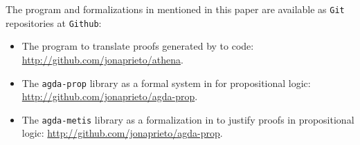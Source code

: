 \documentclass[../main.tex]{subfiles}
\begin{document}

The program and formalizations in \Agda mentioned in this paper are available
as \verb!Git! repositories at \verb!Github!:

\begin{itemize}
  \item The \Athena program to translate proofs generated by \Metis to \Agda code:
  \url{http://github.com/jonaprieto/athena}.
  \item The \verb!agda-prop! library as a formal system in \Agda for propositional logic:
  \url{http://github.com/jonaprieto/agda-prop}.
  \item The \verb!agda-metis! library as a formalization in \Agda to justify \Metis proofs in propositional
  logic:
  \url{http://github.com/jonaprieto/agda-prop}.
\end{itemize}
\end{document}
